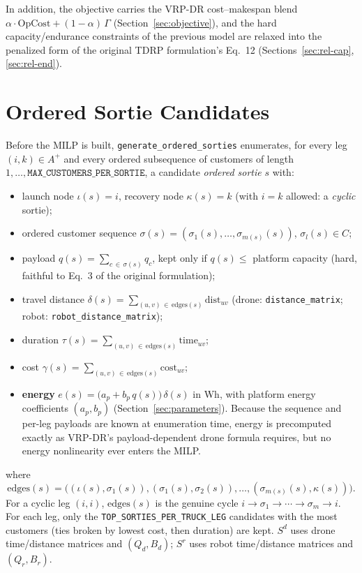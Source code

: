 \documentclass[10pt]{article}
\begin{document}
\noindent In addition, the objective carries the VRP-DR cost--makespan blend
$\alpha\cdot\mathrm{OpCost} + (1-\alpha)\,\Gamma$
(Section~\ref{sec:objective}), and the hard capacity/endurance constraints of
the previous model are relaxed into the penalized form of the original TDRP
formulation's Eq.~12 (Sections~\ref{sec:rel-cap}, \ref{sec:rel-end}).

\section{Ordered Sortie Candidates}
\label{sec:sorties}

Before the MILP is built, \texttt{generate\_ordered\_sorties} enumerates, for
every leg $(i,k)\in A^+$ and every ordered subsequence of customers of length
$1,\dots,\texttt{MAX\_CUSTOMERS\_PER\_SORTIE}$, a candidate \emph{ordered sortie}
$s$ with:

\begin{itemize}
\item launch node $\iota(s) = i$, recovery node $\kappa(s) = k$ (with $i=k$
allowed: a \emph{cyclic} sortie);
\item ordered customer sequence $\sigma(s) = (\sigma_1(s),\dots,\sigma_{m(s)}(s))$, $\sigma_l(s)\in C$;
\item payload $q(s) = \sum_{c\,\in\,\sigma(s)} q_c$, kept only if $q(s) \le$ platform capacity (hard, faithful to Eq.~3 of the original formulation);
\item travel distance $\delta(s) = \sum_{(u,v)\,\in\,\mathrm{edges}(s)} \mathrm{dist}_{uv}$ (drone: \texttt{distance\_matrix}; robot: \texttt{robot\_distance\_matrix});
\item duration $\tau(s) = \sum_{(u,v)\,\in\,\mathrm{edges}(s)} \mathrm{time}_{uv}$;
\item cost $\gamma(s) = \sum_{(u,v)\,\in\,\mathrm{edges}(s)} \mathrm{cost}_{uv}$;
\item \textbf{energy} $e(s) = \big(a_p + b_p\,q(s)\big)\,\delta(s)$ in Wh, with platform energy coefficients $(a_p,b_p)$ (Section~\ref{sec:parameters}). Because the sequence and per-leg payloads are known at enumeration time, energy is precomputed exactly as VRP-DR's payload-dependent drone formula requires, but no energy nonlinearity ever enters the MILP.
\end{itemize}

\noindent where
\[
\mathrm{edges}(s) = \big((\iota(s),\sigma_1(s)),(\sigma_1(s),\sigma_2(s)),\dots,(\sigma_{m(s)}(s),\kappa(s))\big).
\]
For a cyclic leg $(i,i)$, $\mathrm{edges}(s)$ is the genuine cycle
$i \to \sigma_1 \to \cdots \to \sigma_m \to i$.
For each leg, only the \texttt{TOP\_SORTIES\_PER\_TRUCK\_LEG} candidates with
the most customers (ties broken by lowest cost, then duration) are kept.
$S^d$ uses drone time/distance matrices and $(Q_d, B_d)$; $S^r$ uses robot
time/distance matrices and $(Q_r, B_r)$.
\end{document}
